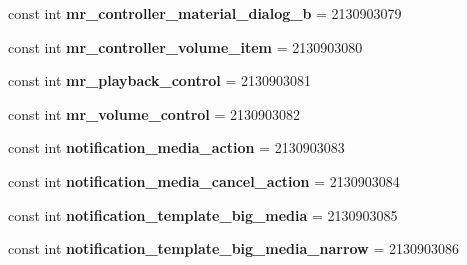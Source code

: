 \begin{DoxyCompactItemize}
\item 
\mbox{\label{class_sample_app_1_1_droid_1_1_resource_1_1_layout_ac08856a9a305bc37a448845d98064e06}} 
const int {\bfseries mr\+\_\+controller\+\_\+material\+\_\+dialog\+\_\+b} = 2130903079
\item 
\mbox{\label{class_sample_app_1_1_droid_1_1_resource_1_1_layout_ab701ee676cfb4ac304b02c9ec6b601cc}} 
const int {\bfseries mr\+\_\+controller\+\_\+volume\+\_\+item} = 2130903080
\item 
\mbox{\label{class_sample_app_1_1_droid_1_1_resource_1_1_layout_ab5d8a2b7df8df4ce07f55ce6fdf44446}} 
const int {\bfseries mr\+\_\+playback\+\_\+control} = 2130903081
\item 
\mbox{\label{class_sample_app_1_1_droid_1_1_resource_1_1_layout_a3dbe520e5a6bde7b8611cdcbceeb683e}} 
const int {\bfseries mr\+\_\+volume\+\_\+control} = 2130903082
\item 
\mbox{\label{class_sample_app_1_1_droid_1_1_resource_1_1_layout_a52024408e81a671b762b6e8752aa694c}} 
const int {\bfseries notification\+\_\+media\+\_\+action} = 2130903083
\item 
\mbox{\label{class_sample_app_1_1_droid_1_1_resource_1_1_layout_a5f9abccd96f838a6bc2d14275bf71121}} 
const int {\bfseries notification\+\_\+media\+\_\+cancel\+\_\+action} = 2130903084
\item 
\mbox{\label{class_sample_app_1_1_droid_1_1_resource_1_1_layout_abf6b69b9840213ce34c5be4bf4d4b11e}} 
const int {\bfseries notification\+\_\+template\+\_\+big\+\_\+media} = 2130903085
\item 
\mbox{\label{class_sample_app_1_1_droid_1_1_resource_1_1_layout_ad00ff654484e858db749c42877cc0bcb}} 
const int {\bfseries notification\+\_\+template\+\_\+big\+\_\+media\+\_\+narrow} = 2130903086
\item 

\end{DoxyCompactItemize}
